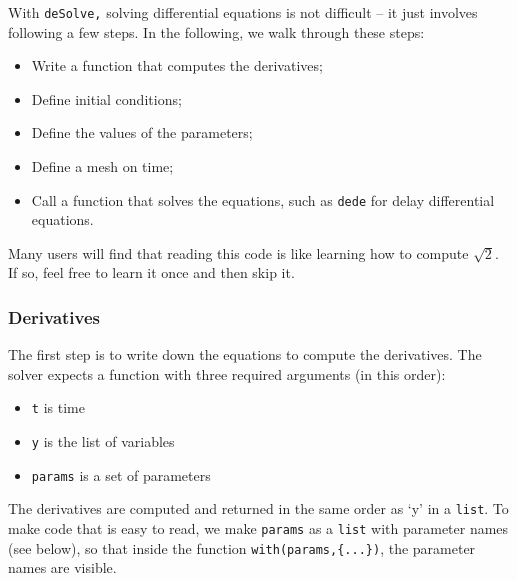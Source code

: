 \documentclass[
]{book}
\begin{document}
With \texttt{deSolve,} solving differential equations is not difficult -- it just involves following a few steps. In the following, we walk through these steps:

\begin{itemize}
\item
  Write a function that computes the derivatives;
\item
  Define initial conditions;
\item
  Define the values of the parameters;
\item
  Define a mesh on time;
\item
  Call a function that solves the equations, such as \texttt{dede} for delay differential equations.
\end{itemize}

Many users will find that reading this code is like learning how to compute \(\sqrt{2}\). If so, feel free to learn it once and then skip it.

\subsubsection{Derivatives}\label{derivatives}

The first step is to write down the equations to compute the derivatives. The solver expects a function with three required arguments (in this order):

\begin{itemize}
\item
  \texttt{t} is time
\item
  \texttt{y} is the list of variables
\item
  \texttt{params} is a set of parameters
\end{itemize}

The derivatives are computed and returned in the same order as `y' in a \texttt{list}. To make code that is easy to read, we make \texttt{params} as a \texttt{list} with parameter names (see below), so that inside the function \texttt{with(params,\{...\})}, the parameter names are visible.
\end{document}
